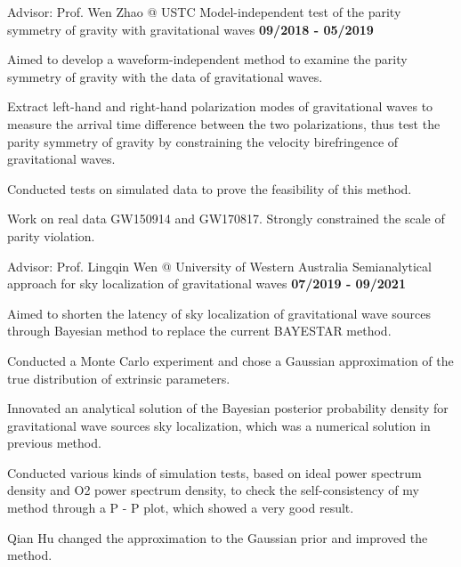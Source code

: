 
\begin{cventries}
\vspace{-0.1cm}
  \cventry
    {\textnormal{Advisor: Prof. Wen Zhao @ USTC}} %
    {Model-independent test of the parity symmetry of gravity with gravitational waves} %
    {\textcolor{awesome-emerald}{\textbf{09/2018 - 05/2019}}} %
    {} %
    {
      \begin{cvitems} %
        \item{\textnormal{Aimed to develop a waveform-independent method to examine the parity symmetry of gravity with the data of gravitational waves.}}
        \item{\textnormal{Extract left-hand and right-hand polarization modes of gravitational waves to measure the arrival time difference between the two polarizations, thus test the parity symmetry of gravity by constraining the velocity birefringence of gravitational waves.}}
        \item{\textnormal{Conducted tests on simulated data to prove the feasibility of this method.}}
        \item{\textnormal{Work on real data GW150914 and GW170817. Strongly constrained the scale of parity violation.}}
      \end{cvitems}
    }
  \vspace{0.4cm}
  \cventry
    {\textnormal{Advisor: Prof. Lingqin Wen @ University of Western Australia}} %
    {Semianalytical approach for sky localization of gravitational waves} %
    {\textcolor{awesome-emerald}{\textbf{07/2019 - 09/2021}}} %
    {} %
    {
      \begin{cvitems} %
        \item{\textnormal{Aimed to shorten the latency of sky localization of gravitational wave sources through Bayesian method to replace the current BAYESTAR method.}}
        \item{\textnormal{Conducted a Monte Carlo experiment and chose a Gaussian approximation of the true distribution of extrinsic parameters.}}
        \item {\textnormal{Innovated an analytical solution of the Bayesian posterior probability density for gravitational wave sources sky localization, which was a numerical solution in previous method.}}
        \item{\textnormal{Conducted various kinds of simulation tests, based on ideal power spectrum density and O2 power spectrum density, to check the self-consistency of my method through a P - P plot, which showed a very good result.}}
        \item{\textnormal{Qian Hu changed the approximation to the Gaussian prior and improved the method.}}
      \end{cvitems}
    }
  \vspace{-0.4cm}
\end{cventries}
